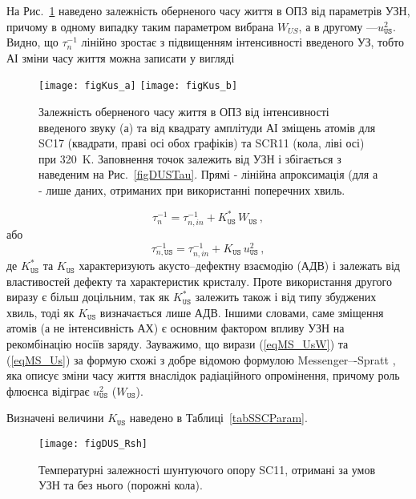 На Рис.~\ref{figKus} наведено залежність оберненого часу життя в ОПЗ від параметрів УЗН,
причому в одному випадку таким параметром вибрана $W_{U\!S}$, а в другому ---$u_\mathtt{US}^2$.
Видно, що $\tau_n^{-1}$ лінійно зростає з підвищенням інтенсивності введеного УЗ,
тобто АІ зміни часу життя можна записати у вигляді

\begin{figure}
\center
\texttt{[image: figKus\_a]} \hfill
\texttt{[image: figKus\_b]}
\caption{\label{figKus}
Залежність оберненого часу життя в ОПЗ від інтенсивності введеного звуку (а)
та від квадрату амплітуди АІ зміщень атомів для SC17 (квадрати, праві осі обох графіків)
та SCR11 (кола, ліві осі) при 320~K.
Заповнення точок залежить від УЗН і збігається з наведеним на Рис.~\ref{figDUSTau}.
Прямі - лінійна апроксимація (для а - лише даних, отриманих при використанні поперечних хвиль.
}%
\end{figure}

\begin{equation}
\label{eqMS_UsW}
\tau_n^{-1}=\tau_{n,in}^{-1}+K_\mathtt{US}^{*}\,W_\mathtt{US}\,,
\end{equation}
або
\begin{equation}
\label{eqMS_Us}
\tau_{n,\mathtt{US}}^{-1}=\tau_{n,in}^{-1}+K_\mathtt{US}\,u_\mathtt{US}^2 \,,
\end{equation}
де $K_\mathtt{US}^{*}$ та $K_\mathtt{US}$ характеризують акусто--дефектну взаємодію (АДВ) і залежать від властивостей дефекту та характеристик кристалу.
Проте використання  другого виразу є більш доцільним, так як $K_\mathtt{US}^{*}$ залежить також і від типу збуджених хвиль,
тоді як $K_\mathtt{US}$ визначається лише АДВ.
Іншими словами, саме зміщення атомів (а не інтенсивність АХ) є основним фактором впливу УЗН на рекомбінацію носіїв заряду.
Зауважимо, що вирази (\ref{eqMS_UsW}) та (\ref{eqMS_Us}) за формую схожі з добре відомою формулою Messenger–-Spratt \cite{Markvart},
яка описує зміни часу життя внаслідок радіаційного опромінення, причому роль флюєнса відіграє $u_\mathtt{US}^2$ ($W_\mathtt{US}$).

Визначені величини $K_\mathtt{US}$ наведено в Таблиці~\ref{tabSSCParam}.

\begin{figure}
\center
\texttt{[image: figDUS\_Rsh]}%
\caption{\label{figDUS_Rsh}
Температурні залежності шунтуючого опору SC11, отримані за умов УЗН та без нього (порожні кола).
}%
\end{figure}


